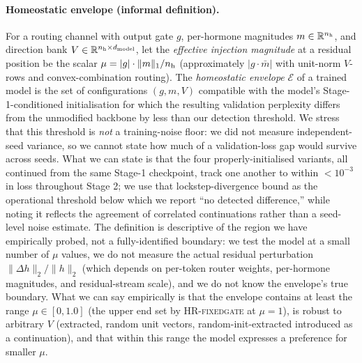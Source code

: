 \paragraph{Homeostatic envelope (informal definition).}
For a routing channel with output gate $g$, per-hormone magnitudes $m \in \mathbb{R}^{n_{\text{h}}}$, and direction bank $V \in \mathbb{R}^{n_{\text{h}} \times d_{\text{model}}}$, let the \emph{effective injection magnitude} at a residual position be the scalar $\mu = |g| \cdot \|m\|_1 / n_{\text{h}}$ (approximately $|g \cdot \bar m|$ with unit-norm $V$-rows and convex-combination routing). The \emph{homeostatic envelope} $\mathcal{E}$ of a trained model is the set of configurations $(g, m, V)$ compatible with the model's Stage-1-conditioned initialisation for which the resulting validation perplexity differs from the unmodified backbone by less than our detection threshold. We stress that this threshold is \emph{not} a training-noise floor: we did not measure independent-seed variance, so we cannot state how much of a validation-loss gap would survive across seeds. What we can state is that the four properly-initialised variants, all continued from the same Stage-1 checkpoint, track one another to within $<10^{-3}$ in loss throughout Stage 2; we use that lockstep-divergence bound as the operational threshold below which we report ``no detected difference,'' while noting it reflects the agreement of correlated continuations rather than a seed-level noise estimate. The definition is descriptive of the region we have empirically probed, not a fully-identified boundary: we test the model at a small number of $\mu$ values, we do not measure the actual residual perturbation $\|\Delta h\|_2 / \|h\|_2$ (which depends on per-token router weights, per-hormone magnitudes, and residual-stream scale), and we do not know the envelope's true boundary. What we can say empirically is that the envelope contains at least the range $\mu \in [0, 1.0]$ (the upper end set by \textsc{HR-fixedgate} at $\mu = 1$), is robust to arbitrary $V$ (extracted, random unit vectors, random-init-extracted introduced as a continuation), and that within this range the model expresses a preference for smaller $\mu$.

